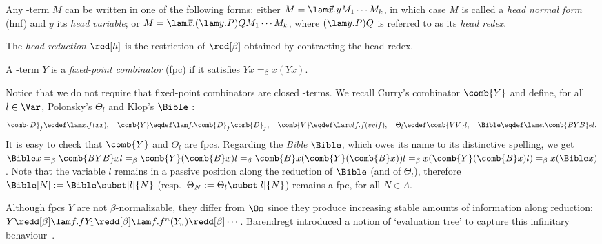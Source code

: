 \begin{remark}\label{rem:hnfs}
Any \lam-term $M$ can be written in one of the following forms: either $M = \lam\vec{x}.yM_1\cdots M_k$, in which case $M$ is called a \emph{head normal form} (hnf) and $y$ its \emph{head variable}; or $M = \lam\vec{x}.(\lam y.P)QM_1\cdots M_k$, where $(\lam y.P)Q$ is referred to as its \emph{head redex}.
\end{remark}
The \emph{head reduction} $\red[h]$ is the restriction of $\red[\beta]$ obtained by contracting the head redex.

\begin{definition} A \lam-term $Y$ is a \emph{fixed-point combinator} (fpc) if it satisfies $Y x =_\beta x(Yx)$.
\end{definition}
Notice that we do not require that fixed-point combinators are closed \lam-terms.
We recall Curry's combinator $\comb{Y}$ and define, for all $l\in\Var$, 
Polonsky's $\Theta_l$ and Klop's $\Bible$ \cite{ManzonettoPSS19}:
\begin{equation}\label{eq:fpc}
	\comb{D}_f \eqdef \lam x.f(xx),\quad
	\comb{Y} \eqdef \lam f.\comb{D}_f\comb{D}_f,\quad
	\comb{V} \eqdef \lam vlf.f(vvlf),\quad
	\Theta_l \eqdef \comb{VV}l,\quad
	\Bible \eqdef \lam e.\comb{BYB}el.
\end{equation}
It is easy to check that $\comb{Y}$ and $\Theta_l$ are fpcs.
Regarding the \emph{Bible} $\Bible$, which owes its name to its distinctive spelling, we get $\Bible x =_\beta \comb{BYB}xl =_\beta \comb{Y}(\comb{B}x)l =_\beta \comb{B}x(\comb{Y}(\comb{B}x))l =_\beta x(\comb{Y}(\comb{B}x)l) =_\beta x(\Bible x)$.
Note that the variable $l$ remains in a passive position along the reduction of $\Bible$ (and of $\Theta_l$), therefore $\Bible[N]:= \Bible\subst[l]{N}$ (resp.\ $\Theta_N:= \Theta_l\subst[l]{N}$) remains a fpc, for all $N\in\Lambda$.

Although fpcs $Y$ are not $\beta$-normalizable, they differ from $\Om$ since they produce increasing stable amounts of information along reduction: $Y\redd[\beta] \lam f.fY_1\redd[\beta] \lam f.f^n(Y_n)\redd[\beta]\cdots$.
Barendregt introduced a notion of `evaluation tree' to capture this infinitary behaviour~\cite{Barendregt77}.\par\addvspace{1.5ex}

